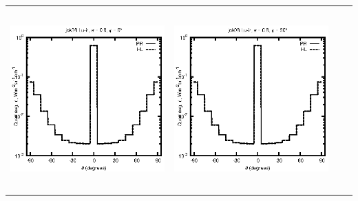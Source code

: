 \documentclass[10pt,a4paper]{article}
\begin{document}
\begin{adjustwidth}{-1.2in}{-1.2in}
\begin{tabular}{c c c c}
\includegraphics[height=7cm]{../eps/jok08_Lu_ir_fwd.eps} &
\includegraphics[height=7cm]{../eps/jok08_Lu_ir_cross.eps} \\
\end{tabular}

\pagebreak


\end{adjustwidth}
\end{document}
